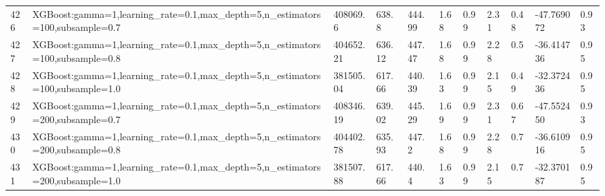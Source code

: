 \begin{longtable}{C{0.8cm} L{2cm} C{1.15cm} C{1.15cm} C{1.15cm} C{1.15cm} C{0.85cm} C{1.25cm} C{1.2cm} C{1.5cm} C{1.0cm}}
426 & XGBoost:\newline gamma=1,\newline learning\_rate=0.1,\newline max\_depth=5,\newline n\_estimators=100,\newline subsample=0.7 & 408069.6 & 638.8 & 444.99 & 1.68 & 0.99 & 2.31 & 0.48 & -47.769072 & 0.93 \\
427 & XGBoost:\newline gamma=1,\newline learning\_rate=0.1,\newline max\_depth=5,\newline n\_estimators=100,\newline subsample=0.8 & 404652.21 & 636.12 & 447.47 & 1.68 & 0.99 & 2.28 & 0.5 & -36.414736 & 0.95 \\
428 & XGBoost:\newline gamma=1,\newline learning\_rate=0.1,\newline max\_depth=5,\newline n\_estimators=100,\newline subsample=1.0 & 381505.04 & 617.66 & 440.39 & 1.63 & 0.99 & 2.15 & 0.49 & -32.372436 & 0.95 \\
429 & XGBoost:\newline gamma=1,\newline learning\_rate=0.1,\newline max\_depth=5,\newline n\_estimators=200,\newline subsample=0.7 & 408346.19 & 639.02 & 445.29 & 1.69 & 0.99 & 2.31 & 0.67 & -47.552450 & 0.93 \\
430 & XGBoost:\newline gamma=1,\newline learning\_rate=0.1,\newline max\_depth=5,\newline n\_estimators=200,\newline subsample=0.8 & 404402.78 & 635.93 & 447.2 & 1.68 & 0.99 & 2.28 & 0.7 & -36.610916 & 0.95 \\
431 & XGBoost:\newline gamma=1,\newline learning\_rate=0.1,\newline max\_depth=5,\newline n\_estimators=200,\newline subsample=1.0 & 381507.88 & 617.66 & 440.4 & 1.63 & 0.99 & 2.15 & 0.7 & -32.370187 & 0.95 \\

\end{longtable}
